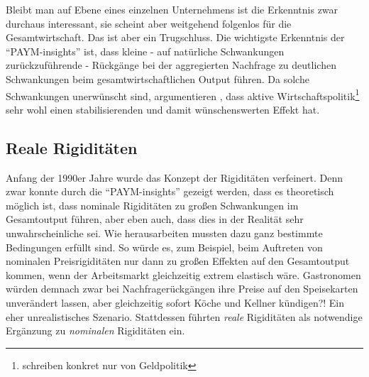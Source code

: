 Bleibt man auf Ebene eines einzelnen Unternehmens ist die Erkenntnis zwar durchaus interessant, sie scheint aber weitgehend folgenlos für die Gesamtwirtschaft. Das ist aber ein Trugschluss. Die wichtigste Erkenntnis der "`PAYM-insights"' ist, dass kleine - auf natürliche Schwankungen zurückzuführende - Rückgänge bei der aggregierten Nachfrage zu deutlichen Schwankungen beim gesamtwirtschaftlichen Output führen\parencite[S. 375]{Snowdon2005}. Da solche Schwankungen unerwünscht sind, argumentieren \textcite{Akerlof1985}, dass aktive Wirtschaftspolitik\footnote{\textcite[S.837]{Akerlof1985} schreiben konkret nur von Geldpolitik} sehr wohl einen stabilisierenden und damit wünschenswerten Effekt hat.


\subsection{Reale Rigiditäten}
\label{Reale Rigiditäten}

Anfang der 1990er Jahre wurde das Konzept der Rigiditäten verfeinert. Denn zwar konnte durch die "`PAYM-insights"' gezeigt werden, dass es theoretisch möglich ist, dass nominale Rigiditäten zu großen Schwankungen im Gesamtoutput führen, aber eben auch, dass dies in der Realität sehr unwahrscheinliche sei. Wie \textcite[S. 183]{RomerDavid1990} herausarbeiten mussten dazu ganz bestimmte Bedingungen erfüllt sind. So würde es, zum Beispiel, beim Auftreten von nominalen Preisrigiditäten nur dann zu großen Effekten auf den Gesamtoutput kommen, wenn der Arbeitsmarkt gleichzeitig extrem elastisch wäre. Gastronomen würden demnach zwar bei Nachfragerückgängen ihre Preise auf den Speisekarten unverändert lassen, aber gleichzeitig sofort Köche und Kellner kündigen?! Ein eher unrealistisches Szenario. Stattdessen führten \textcite{RomerDavid1990, Ball1988, Ball1989} \textit{reale} Rigiditäten als notwendige Ergänzung zu \textit{nominalen} Rigiditäten ein.


